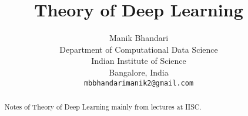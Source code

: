 \documentclass{article}
\title{Theory of Deep Learning}
\author{
	Manik Bhandari\\
	Department of Computational Data Science\\
	Indian Institute of Science\\
	Bangalore, India \\
	\texttt{mbbhandarimanik2@gmail.com} \\
}
\begin{document}
	
	\maketitle
	\begin{abstract}
		Notes of Theory of Deep Learning mainly from lectures at IISC.
	\end{abstract}
	



	
	
\end{document}
